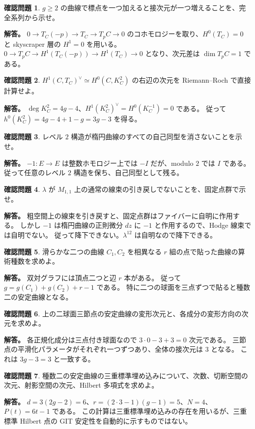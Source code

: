 \documentclass[dvipdfmx,a4paper,11pt]{article}
\theoremstyle{definition}
\newtheorem{ques}{確認問題}[section]
\begin{document}
\begin{ques}
$g\ge2$ の曲線で標点を一つ加えると接次元が一つ増えることを、完全系列から示せ。
\end{ques}
\textbf{解答。}
$0\to T_C(-p)\to T_C\to T_pC\to0$ のコホモロジーを取り、$H^0(T_C)=0$ と skyscraper 層の $H^1=0$ を用いる。
$0\to T_pC\to H^1(T_C(-p))\to H^1(T_C)\to0$ となり、次元差は $\dim T_pC=1$ である。

\begin{ques}
$H^1(C,T_C)^\vee\simeq H^0(C,K_C^2)$ の右辺の次元を Riemann--Roch で直接計算せよ。
\end{ques}
\textbf{解答。}
$\deg K_C^2=4g-4$、$H^1(K_C^2)^\vee=H^0(K_C^{-1})=0$ である。
従って $h^0(K_C^2)=4g-4+1-g=3g-3$ を得る。

\begin{ques}
レベル $2$ 構造が楕円曲線のすべての自己同型を消さないことを示せ。
\end{ques}
\textbf{解答。}
$-1:E\to E$ は整数ホモロジー上では $-I$ だが、modulo $2$ では $I$ である。
従って任意のレベル $2$ 構造を保ち、自己同型として残る。

\begin{ques}
$\lambda$ が $M_{1,1}$ 上の通常の線束の引き戻しでないことを、固定点群で示せ。
\end{ques}
\textbf{解答。}
粗空間上の線束を引き戻すと、固定点群はファイバーに自明に作用する。
しかし $-1$ は楕円曲線の正則微分 $dz$ に $-1$ と作用するので、Hodge 線束では自明でない。
従って降下できない。$\lambda^{12}$ は自明なので降下できる。

\begin{ques}
滑らかな二つの曲線 $C_1,C_2$ を相異なる $r$ 組の点で貼った曲線の算術種数を求めよ。
\end{ques}
\textbf{解答。}
双対グラフには頂点二つと辺 $r$ 本がある。
従って $g=g(C_1)+g(C_2)+r-1$ である。
特に二つの球面を三点ずつで貼ると種数二の安定曲線となる。

\begin{ques}
上の二球面三節点の安定曲線の変形次元と、各成分の変形方向の次元を求めよ。
\end{ques}
\textbf{解答。}
各正規化成分は三点付き球面なので $3\cdot0-3+3=0$ 次元である。
三節点の平滑化パラメータがそれぞれ一つずつあり、全体の接次元は $3$ となる。
これは $3g-3=3$ と一致する。

\begin{ques}
種数二の安定曲線の三重標準埋め込みについて、次数、切断空間の次元、射影空間の次元、Hilbert 多項式を求めよ。
\end{ques}
\textbf{解答。}
$d=3(2g-2)=6$、$r=(2\cdot3-1)(g-1)=5$、$N=4$、$P(t)=6t-1$ である。
この計算は三重標準埋め込みの存在を用いるが、三重標準 Hilbert 点の GIT 安定性を自動的に示すものではない。
\end{document}
